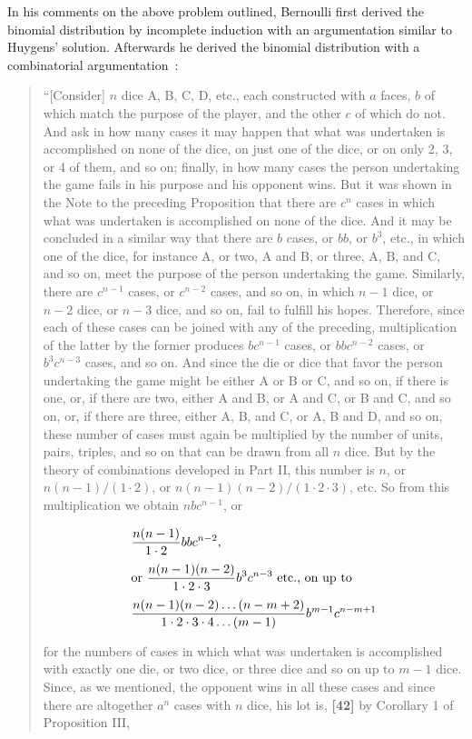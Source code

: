 In his comments on the above problem outlined, Bernoulli first derived the binomial distribution by incomplete induction with an argumentation similar to Huygens' solution. Afterwards he derived the binomial distribution with a combinatorial argumentation~\cite[pp. 165-167]{bernoulli}:

\begin{quotation}
  ``[Consider] $n$ dice A, B, C, D, etc., each constructed with $a$ faces, $b$ of which match the purpose of the player, and the other $c$ of which do not. And ask in how many cases it may happen that what was undertaken is accomplished on none of the dice, on just one of the dice, or on only 2, 3, or 4 of them, and so on; finally, in how many cases the person undertaking the game fails in his purpose and his opponent wins. But it was shown in the Note to the preceding Proposition that there are $c^n$ cases in which what was undertaken is accomplished on none of the dice. And it may be concluded in a similar way that there are $b$ cases, or $bb$, or $b^3$, etc., in which one of the dice, for instance A, or two, A and B, or three, A, B, and C, and so on, meet the purpose of the person undertaking the game. Similarly, there are $c^{n-1}$ cases, or $c^{n-2}$ cases, and so on, in which $n-1$ dice, or $n-2$ dice, or $n-3$ dice, and so on, fail to fulfill his hopes. Therefore, since each of these cases can be joined with any of the preceding, multiplication of the latter by the former produces $bc^{n-1}$ cases, or $bbc^{n-2}$ cases, or $b^3c^{n-3}$ cases, and so on. And since the die or dice that favor the person undertaking the game might be either A or B or C, and so on, if there is one, or, if there are two, either A and B, or A and C, or B and C, and so on, or, if there are three, either A, B, and C, or A, B and D, and so on, these number of cases must again be multiplied by the number of units, pairs, triples, and so on that can be drawn from all $n$ dice. But by the theory of combinations developed in Part II, this number is $n$, or $n(n-1)/(1\cdot 2)$, or $n(n-1)(n-2)/(1\cdot 2\cdot 3)$, etc. So from this multiplication we obtain $nbc^{n-1}$, or

  \begin{align*}
      & \frac{n(n-1)}{1\cdot 2}bbc^{n-2}, \nl
      & \text{or } \frac{n(n-1)(n-2)}{1\cdot 2\cdot 3}b^3c^{n-3} \text{ etc., on up to} \nl
      & \frac{n(n-1)(n-2)\ldots(n-m+2)}{1\cdot 2\cdot 3\cdot 4\ldots(m-1)} b^{m-1} c^{n-m+1}
  \end{align*}

  for the numbers of cases in which what was undertaken is accomplished with exactly one die, or two dice, or three dice and so on up to $m-1$ dice. Since, as we mentioned, the opponent wins in all these cases and since there are altogether $a^n$ cases with $n$ dice, his lot is, \textbf{[42]} by Corollary 1 of Proposition III,


\end{quotation}
